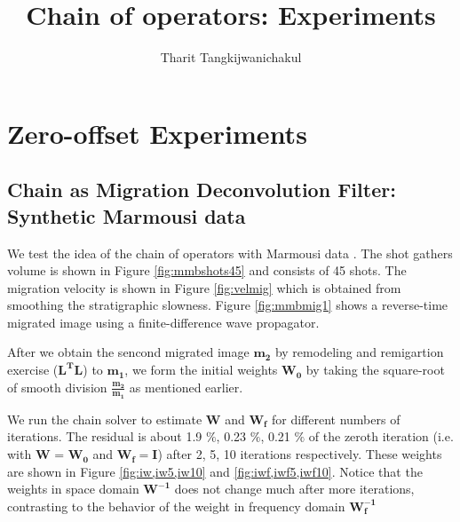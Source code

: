 \title{Chain of operators: Experiments}
\renewcommand{\thefootnote}{\fnsymbol{footnote}}
\relax{}
\author{Tharit Tangkijwanichakul}
\label{ch:chapter-lsrtm}

\maketitle

\section{Zero-offset Experiments}

\subsection{Chain as Migration Deconvolution Filter: Synthetic Marmousi data}
%

We test the idea of the chain of operators with Marmousi data \cite[]{versteeg1994}. The shot gathers volume is shown in Figure \ref{fig:mmbshots45} and consists of 45 shots. The migration velocity is shown in Figure \ref{fig:velmig} which is obtained from smoothing the stratigraphic slowness. Figure \ref{fig:mmbmig1} shows a reverse-time migrated image using a finite-difference wave propagator. 



%

After we obtain the sencond migrated image $\mathbf{m_2}$ by remodeling and remigartion exercise ($\mathbf{L^{T}L}$) to $\mathbf{m_1}$, we form the initial weights $\mathbf{W_0}$ by taking the square-root of smooth division $\mathbf{\frac{m_2}{m_1}}$ as mentioned earlier.

We run the chain solver to estimate $\mathbf{W}$ and $\mathbf{W_f}$ for different numbers of iterations. The residual is about 1.9 $\%$, 0.23 $\%$, 0.21 $\%$ of the zeroth iteration (i.e. with $\mathbf{W}$ = $\mathbf{W_0}$ and $\mathbf{W_f} = \mathbf{I}$) after 2, 5, 10 iterations respectively. These weights are shown in Figure \ref{fig:iw,iw5,iw10} and \ref{fig:iwf,iwf5,iwf10}. Notice that the weights in space domain $\mathbf{W^{-1}}$ does not change much after more iterations, contrasting to the behavior of the weight in frequency domain $\mathbf{W_f^{-1}}$

